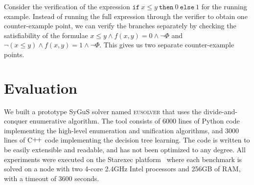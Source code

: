 \documentclass{llncs}
\newcommand\Spec{\Phi}
\newcommand\ITE[3]{\mathtt{if}~#1~\mathtt{then}~#2~\mathtt{else}~#3}
\newcommand{\sygus}{{\sffamily\fontsize{8.5}{10}\selectfont
    SyGuS}\xspace}
\newcommand{\eusolver}{\textsc{eusolver}\xspace}
\begin{document}
\vspace*{-2mm}
\begin{example}
  Consider the verification of the expression $\ITE{x \leq y}{0}{1}$
  for the running example.
  Instead of running the full expression through the verifier to
  obtain one counter-example point, we can verify the branches
  separately by checking the satisfiability of the formulae $x \leq y
  \wedge f(x, y) = 0 \wedge \neg \Spec$ and $\neg (x \leq y) \wedge f(x,
  y) = 1 \wedge \neg \Spec$.
  This gives us two separate counter-example points.
\end{example}

\vspace{-3ex}
\section{Evaluation}
\label{sec:evaluation}
% 
% 

We built a prototype \sygus solver named \eusolver that uses the
divide-and-conquer enumerative algorithm.
The tool consists of 6000 lines of Python code implementing the
high-level enumeration and unification algorithms, and 3000 lines of
C$\raisebox{1pt}{+\!+}$ code implementing the decision tree learning.
The code is written to be easily extensible and readable, and has not
been optimized to any degree.
All experiments were executed on the Starexec platform~\cite{starexec}
where each benchmark is solved on a node with two 4-core
2.4GHz Intel processors and 256GB of RAM, with a timeout of $3600$
seconds.
\end{document}
